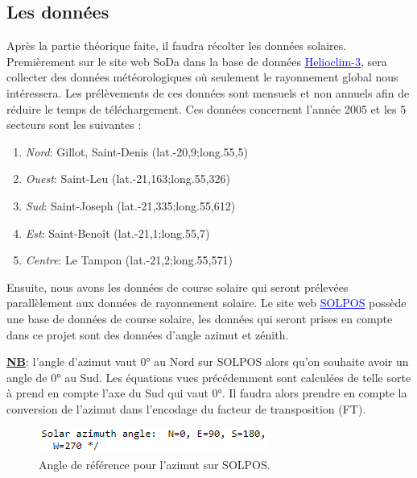 \documentclass[12pt,a4paper,openright]{report}
\begin{document}
\subsection{Les données}
Après la partie théorique faite, il faudra récolter les données solaires.
Premièrement sur le site web SoDa dans la base de données \href{http://www.soda-pro.com/web-services/radiation/helioclim-3-archives-for-free}{\textcolor{blue}{\underline{Helioclim-3}}}, sera collecter des données météorologiques où seulement le rayonnement global nous intéressera. Les prélèvements de ces données sont mensuels et non annuels afin de réduire le temps de téléchargement. Ces données concernent l'année 2005 et les 5 secteurs sont les suivantes :

\begin{enumerate}
\item \textit{Nord}: Gillot, Saint-Denis (lat.-20,9;long.55,5)
\item \textit{Ouest}: Saint-Leu (lat.-21,163;long.55,326)
\item \textit{Sud}: Saint-Joseph (lat.-21,335;long.55,612)
\item \textit{Est}: Saint-Benoît (lat.-21,1;long.55,7)
\item \textit{Centre}: Le Tampon (lat.-21,2;long.55,571)
\end{enumerate}

Ensuite, nous avons les données de course solaire qui seront prélevées parallèlement aux données de rayonnement solaire. Le site web \href{https://midcdmz.nrel.gov/solpos/solpos.html}{\textcolor{blue}{\underline{SOLPOS}}} possède une base de données de course solaire,  les données qui seront prises en compte dans ce projet sont des données d'angle azimut et zénith. 

\textbf{\underline{NB}}: l'angle d'azimut vaut 0° au Nord sur SOLPOS alors qu'on souhaite avoir un angle de 0° au Sud. Les équations vues précédemment sont calculées de telle sorte à prend en compte l'axe du Sud qui vaut 0°. Il faudra alors prendre en compte la conversion de l'azimut dans l'encodage du facteur de transposition (FT).

\begin{figure}[h!]
\begin{center}
\includegraphics[scale=1]{refAzimuth}
\caption{Angle de référence pour l'azimut sur SOLPOS.}
\end{center}
\end{figure}
\end{document}
